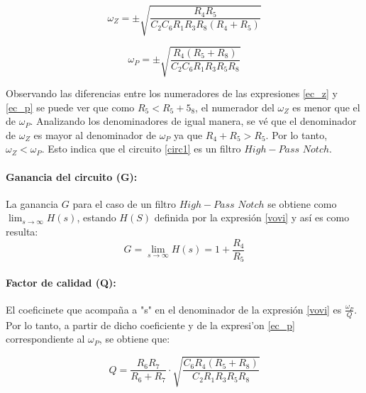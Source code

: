 \begin{equation}
	\omega_Z = \pm\sqrt{\frac{R_4 R_5}{C_2 C_6 R_1 R_3 R_8 (R_4 + R_5)}}
	\label{ec_z}
\end{equation}

\begin{equation}
	\omega_P = \pm \sqrt{\frac{R_4 (R_5 + R_8)}{C_2 C_6 R_1 R_3 R_5 R_8}}
	\label{ec_p}
\end{equation}

Observando las diferencias entre los numeradores de las expresiones \ref{ec_z} y \ref{ec_p} se puede ver que como $R_5 < R_5 + 5_8$, el numerador del $\omega_Z$ es menor que el de $\omega_P$. Analizando los denominadores de igual manera, se v\'e que el denominador de $\omega_Z$ es mayor al denominador de $\omega_P$ ya que $R_4 + R_5 > R_5$. Por lo tanto, $\omega_Z < \omega_P$. Esto indica que el circuito \ref{circ1} es un filtro $High-Pass$ $ Notch$.


\paragraph*{Ganancia del circuito (G):}  La ganancia $G$ para el caso de un filtro $High-Pass$ $ Notch$ se obtiene como $\lim_{s\to\infty}H(s)$, estando $H(S)$ definida por la expresi\'on \ref{vovi} y as\'i es como resulta:
 \begin{equation}
	G = \lim_{s\to\infty}H(s) = 1 + \frac{R_4}{R_5} 
\label{G}
\end{equation}

\paragraph*{Factor de calidad (Q):} El coeficinete que acompa\~na a "s" en el denominador de la expresi\'on \ref{vovi} es $\frac{\omega_P}{Q}$. Por lo tanto, a partir de dicho coeficiente y de la expresi'on \ref{ec_p} correspondiente al $\omega_P$, se obtiene que:

\begin{equation}
	Q = \frac{R_{6} R_{7}}{R_{6} + R_{7}} \cdot \sqrt{\frac{C_{6} R_{4} \left(R_{5} + R_{8}\right)}{C_{2} R_{1} R_{3}R_{5} R_{8} }}
\end{equation}
	
	
	
	
	
	